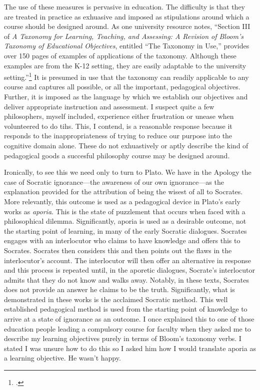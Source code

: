 \documentclass[letterpaper,notitlepage,12pt]{article}
\begin{document}
The use of these measures is pervasive in education.
The difficulty is that they are treated in practice as exhuasive and imposed as
stipulations around which a course should be designed around.  As one university
resource notes, ``Section III of \textit{A Taxonomy for Learning, Teaching, and
Assessing: A Revision of Bloom’s Taxonomy of Educational Objectives}, entitled
“The Taxonomy in Use,” provides over 150 pages of examples of applications of
the taxonomy. Although these examples are from the K-12 setting, they are easily
adaptable to the university setting.''\footcite{armstrong_blooms_nodate}
It is presumed in use that the taxonomy can readily applicable to any course and
captures all possible, or all the important, pedagogical objectives.
Further, it is imposed as the language by which we establish our objectives and
deliver appropriate instruction and assessment.
I suspect quite a few philosophers, myself included, experience either
frustration or unease when volunteered to do tihs.
This, I contend, is a reasonable response because it responds to the
inappropriateness of trying to reduce our purpose into the cognitive domain
alone.
These do not exhuastively or aptly describe the kind of pedagogical goods a
succesful philosophy course may be designed around.

Ironically, to see this we need only to turn to Plato.
We have in the Apology the case of Socratic ignorance---the awareness of our own
ignorance---as the explanation provided for the attribution of being the wisest
of all to Socrates.
More relevantly, this outcome is used as a pedagogical device in Plato's early
works as \textit{aporia}.
This is the state of puzzlement that occurs when faced with a philosophical
dilemma.
Significantly, aporia is used as a desirable outcome, not the starting point of
learning, in many of the early Socratic dialogues.
Socrates engages with an interlocutor who claims to have knowledge and offers
this to Socrates.
Socrates then considers this and then points out the flaws in the interlocutor's
account.
The interlocutor will then offer an alternative in response and this process is
repeated until, in the aporetic dialogues, Socrate's interlocutor admits that
they do not know and walks away.
Notably, in these texts, Socrates does not provide an answer he claims to be the
truth.
Significantly, what is demonstrated in these works is the acclaimed Socratic
method.
This well established pedagogical method is used from the starting point of
knowledge to arrive at a state of ignorance as an outcome.
I once explained this to one of those education people leading a compulsory
course for faculty when they asked me to describe my learning objectives purely
in terms of Bloom's taxonomy verbs. 
I stated I was unsure how to do this so I asked him how I would translate aporia
as a learning objective.
He wasn't happy.
\end{document}
